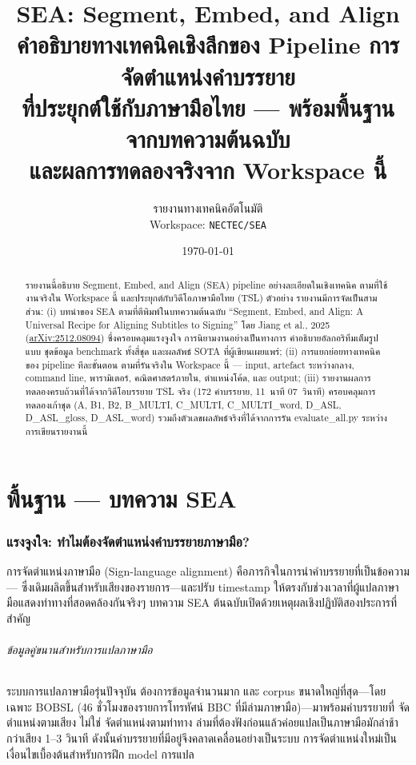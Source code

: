 \documentclass[11pt,a4paper]{article}
\title{\textbf{SEA: Segment, Embed, and Align} \\[6pt]
       \large คำอธิบายทางเทคนิคเชิงลึกของ Pipeline การจัดตำแหน่งคำบรรยาย \\
       ที่ประยุกต์ใช้กับภาษามือไทย --- พร้อมพื้นฐานจากบทความต้นฉบับ \\
       และผลการทดลองจริงจาก Workspace นี้}
\author{รายงานทางเทคนิคอัตโนมัติ \\
        Workspace: \texttt{NECTEC/SEA}}
\date{\today}
\def\texttt#1{#1}%
\def\textbf#1{#1}%
\def\emph#1{#1}%
\begin{document}
\maketitle

\begin{abstract}
\noindent
รายงานนี้อธิบาย \emph{Segment, Embed, and Align} (SEA) pipeline
อย่างละเอียดในเชิงเทคนิค ตามที่ใช้งานจริงใน Workspace นี้
และประยุกต์กับวิดีโอภาษามือไทย (TSL) ตัวอย่าง
รายงานมีการจัดเป็นสามส่วน:
\textbf{(i)} บทนำของ SEA ตามที่ตีพิมพ์ในบทความต้นฉบับ
\emph{``Segment, Embed, and Align: A Universal Recipe for Aligning Subtitles to
Signing''} โดย Jiang et al., 2025
(\href{https://arxiv.org/abs/2512.08094}{arXiv:2512.08094})
ซึ่งครอบคลุมแรงจูงใจ การนิยามงานอย่างเป็นทางการ คำอธิบายอัลกอริทึมเต็มรูปแบบ
ชุดข้อมูล benchmark ทั้งสี่ชุด และผลลัพธ์ SOTA ที่ผู้เขียนเผยแพร่;
\textbf{(ii)} การแยกย่อยทางเทคนิคของ pipeline ทีละขั้นตอน
ตามที่รันจริงใน Workspace นี้ --- input, artefact ระหว่างกลาง,
command line, พารามิเตอร์, คณิตศาสตร์ภายใน, ตำแหน่งโค้ด, และ output;
\textbf{(iii)} รายงานผลการทดลองครบถ้วนที่ได้จากวิดีโอบรรยาย TSL จริง
(172 คำบรรยาย, 11~นาที 07~วินาที) ครอบคลุมการทดลองเก้าชุด
(\texttt{A}, \texttt{B1}, \texttt{B2}, \texttt{B\_MULTI}, \texttt{C\_MULTI},
\texttt{C\_MULTI\_word}, \texttt{D\_ASL}, \texttt{D\_ASL\_gloss},
\texttt{D\_ASL\_word}) รวมถึงตัวเลขผลลัพธ์จริงที่ได้จากการรัน
\texttt{evaluate\_all.py} ระหว่างการเขียนรายงานนี้
\end{abstract}

\tableofcontents
\clearpage

\part{พื้นฐาน --- บทความ SEA}

\section{แรงจูงใจ: ทำไมต้องจัดตำแหน่งคำบรรยายภาษามือ?}
\label{sec:motivation}

การจัดตำแหน่งภาษามือ (Sign-language alignment) คือภารกิจในการนำคำบรรยายที่เป็นข้อความ---
ซึ่งเดิมผลิตขึ้นสำหรับเสียงของรายการ---และปรับ timestamp
ให้ตรงกับช่วงเวลาที่ผู้แปลภาษามือแสดงท่าทางที่สอดคล้องกันจริงๆ
บทความ SEA ต้นฉบับเปิดด้วยเหตุผลเชิงปฏิบัติสองประการที่สำคัญ

\paragraph{ข้อมูลคู่ขนานสำหรับการแปลภาษามือ}
ระบบการแปลภาษามือรุ่นปัจจุบัน \cite{muller-etal-2022-findings,muller-etal-2023-findings}
ต้องการข้อมูลจำนวนมาก และ corpus ขนาดใหญ่ที่สุด---โดยเฉพาะ BOBSL
(46 ชั่วโมงของรายการโทรทัศน์ BBC ที่มีล่ามภาษามือ)---มาพร้อมคำบรรยายที่
\emph{จัดตำแหน่งตามเสียง} ไม่ใช่ \emph{จัดตำแหน่งตามท่าทาง}
ล่ามที่ต้องฟังก่อนแล้วค่อยแปลเป็นภาษามือมักล่าช้ากว่าเสียง 1--3 วินาที
ดังนั้นคำบรรยายที่มีอยู่จึงคลาดเคลื่อนอย่างเป็นระบบ
การจัดตำแหน่งใหม่เป็นเงื่อนไขเบื้องต้นสำหรับการฝึก model การแปล
\end{document}
